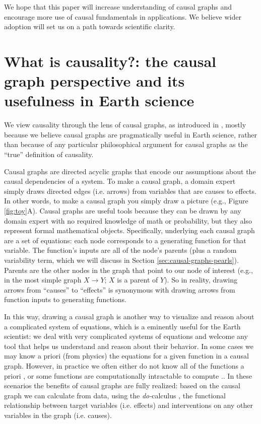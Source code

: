 \documentclass[12pt]{article}
\begin{document}
We hope that this paper will increase understanding of causal graphs
and encourage more use of causal fundamentals in applications. We
believe wider adoption will set us on a path towards scientific
clarity.

\section{What is causality?: the causal graph perspective and its
  usefulness in Earth science}\label{sec:what-caus-caus}

We view causality through the lens of causal graphs, as introduced in
\citet{pearl1995causal}, mostly because we believe causal graphs are
pragmatically useful in Earth science, rather than because of any
particular philosophical argument for causal graphs as the ``true''
definition of causality.

Causal graphs are directed acyclic graphs that encode our assumptions
about the causal dependencies of a system.  To make a causal graph, a
domain expert simply draws directed edges (i.e. arrows) from variables
that are causes to effects. In other words, to make a causal graph you
simply draw a picture (e.g., Figure \ref{fig:toy}A). Causal graphs are
useful tools because they can be drawn by any domain expert with no
required knowledge of math or probability, but they also represent
formal mathematical objects. Specifically, underlying each causal
graph are a set of equations: each node corresponds to a generating
function for that variable. The function's inputs are all of the
node's parents (plus a random variability term, which we will discuss
in Section \ref{sec:causal-graphs-pearls}). Parents are the other
nodes in the graph that point to our node of interest (e.g., in the
most simple graph $X \to Y$; $X$ is a parent of $Y$). So in reality,
drawing arrows from ``causes'' to ``effects'' is synonymous with
drawing arrows from function inputs to generating functions.

In this way, drawing a causal graph is another way to visualize and
reason about a complicated system of equations, which is a eminently
useful for the Earth scientist: we deal with very complicated systems
of equations and welcome any tool that helps us understand and reason
about their behavior. In some cases we may know a priori (from
physics) the equations for a given function in a causal
graph. However, in practice we often either do not know all of the
functions a priori \citep[e.g., plant stomata response to
VPD;][]{massmann2019}, or some functions are computationally
intractable to compute \citep[e.g., turbulence, moist convection, and
cloud microphysics in large scale models;][]{zadra2018}.. In these
scenarios the benefits of causal graphs are fully realized: based on
the causal graph we can calculate from data, using the
\textit{do-}calculus \citep{pearl-1994-do-calculus}, the functional
relationship between target variables (i.e. effects) and interventions
on any other variables in the graph (i.e. causes).
\end{document}
